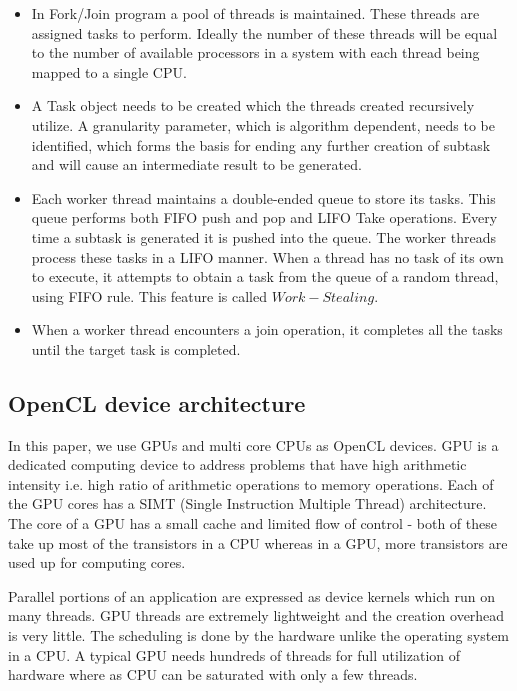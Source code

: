 \documentclass[conference]{IEEEtran}
\begin{document}
\begin{itemize}
\item{In Fork/Join program a pool of threads is maintained. These threads are assigned tasks to perform. Ideally the number of these threads will be equal to the number of available processors in a system with each thread being mapped to a single CPU.}
\item{A Task object needs to be created which the threads created recursively utilize.  A granularity parameter, which is algorithm dependent, needs to be identified, which forms the basis for ending any further creation of subtask and will cause an intermediate result to be generated.}
\item{Each worker thread maintains a double-ended queue to store its tasks. This queue performs both FIFO push and pop and LIFO Take operations. Every time a subtask is generated it is pushed into the queue. The worker threads process these tasks in a LIFO manner. When a thread has no task of its own to execute, it attempts to obtain a task from the queue of a random thread, using FIFO rule. This feature is called $Work-Stealing$.}
\item{When a worker thread encounters a join operation, it completes all the tasks until the target task is completed.}
\end{itemize}


\subsection{ OpenCL device architecture} \label{sec:gpuArch}

In this paper, we use GPUs and multi core CPUs as OpenCL devices. GPU is a dedicated computing device to address problems that have high arithmetic intensity i.e. high ratio of arithmetic operations to memory operations. Each of the GPU cores has a SIMT (Single Instruction Multiple Thread) architecture. The core of a GPU has a small cache and limited flow of control - both of these take up most of the transistors in a CPU whereas in a GPU, more transistors are used up for computing cores.

Parallel portions of an application are expressed as device kernels which run on many threads. GPU threads are extremely lightweight and the creation overhead is very little. The scheduling is done by the hardware unlike the operating system in a CPU. A typical GPU needs hundreds of threads for full utilization of hardware where as CPU can be saturated with only a few threads.
\end{document}
